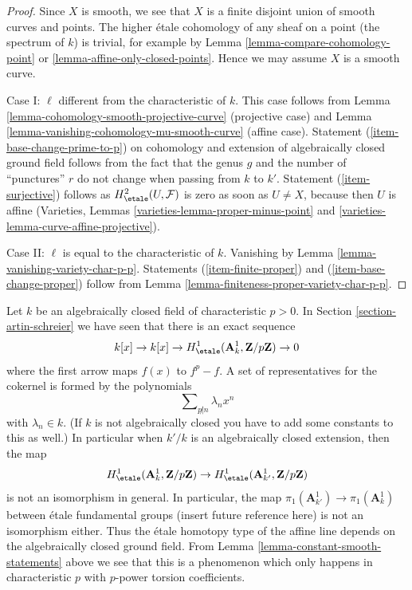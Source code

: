 \begin{proof}
Since $X$ is smooth, we see that $X$ is a finite disjoint union of
smooth curves and points. The higher \'etale cohomology of any sheaf
on a point (the spectrum of $k$) is trivial, for example by
Lemma \ref{lemma-compare-cohomology-point}
or \ref{lemma-affine-only-closed-points}.
Hence we may assume $X$ is a smooth curve.

\medskip\noindent
Case I: $\ell$ different from the characteristic of $k$.
This case follows from
Lemma \ref{lemma-cohomology-smooth-projective-curve}
(projective case) and
Lemma \ref{lemma-vanishing-cohomology-mu-smooth-curve}
(affine case). Statement (\ref{item-base-change-prime-to-p})
on cohomology and extension of algebraically closed ground
field follows from the fact that the genus $g$ and the number
of ``punctures'' $r$ do not change when passing from $k$ to $k'$.
Statement (\ref{item-surjective}) follows as $H^2_\etale(U, \mathcal{F})$
is zero as soon as $U \not = X$, because then $U$ is affine
(Varieties, Lemmas \ref{varieties-lemma-proper-minus-point} and
\ref{varieties-lemma-curve-affine-projective}).

\medskip\noindent
Case II: $\ell$ is equal to the characteristic of $k$.
Vanishing by Lemma \ref{lemma-vanishing-variety-char-p-p}.
Statements (\ref{item-finite-proper}) and (\ref{item-base-change-proper})
follow from
Lemma \ref{lemma-finiteness-proper-variety-char-p-p}.
\end{proof}

\begin{remark}
\label{remark-invariance}
Let $k$ be an algebraically closed field of characteristic $p > 0$.
In Section \ref{section-artin-schreier} we have seen that there is
an exact sequence
$$
k[x] \to k[x] \to
H^1_\etale(\mathbf{A}^1_k, \mathbf{Z}/p\mathbf{Z}) \to 0
$$
where the first arrow maps $f(x)$ to $f^p - f$. A set of representatives
for the cokernel is formed by the polynomials
$$
\sum\nolimits_{p \not | n} \lambda_n x^n
$$
with $\lambda_n \in k$. (If $k$ is not algebraically closed
you have to add some constants to this as well.) In particular
when $k'/k$ is an algebraically closed extension, then
the map
$$
H^1_\etale(\mathbf{A}^1_k, \mathbf{Z}/p\mathbf{Z})
\to
H^1_\etale(\mathbf{A}^1_{k'}, \mathbf{Z}/p\mathbf{Z})
$$
is not an isomorphism in general. In particular, the map
$\pi_1(\mathbf{A}^1_{k'}) \to \pi_1(\mathbf{A}^1_k)$
between \'etale fundamental groups (insert future reference here)
is not an isomorphism either. Thus the \'etale homotopy type
of the affine line depends on the algebraically closed ground field.
From Lemma \ref{lemma-constant-smooth-statements} above we see that
this is a phenomenon which only happens in characteristic $p$
with $p$-power torsion coefficients.
\end{remark}

